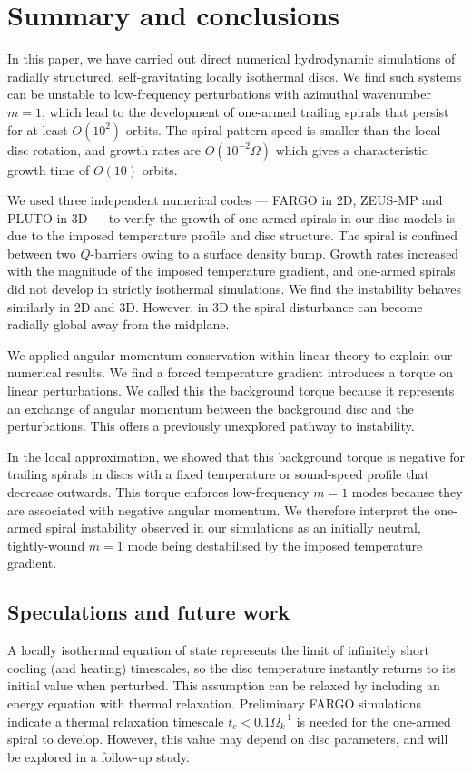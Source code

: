 \section{Summary and conclusions}\label{summary}
In this paper, we have carried out direct numerical hydrodynamic
simulations of radially structured, self-gravitating locally
isothermal discs.     
We find such systems can be unstable to low-frequency perturbations
with azimuthal wavenumber $m=1$, which lead to the development of one-armed 
trailing spirals that persist for at least $O(10^2)$ orbits. The 
spiral pattern speed is smaller than the local disc rotation, and
growth rates are $O(10^{-2}\Omega)$ which gives a characteristic
growth time of $O(10)$ orbits.   

We used three independent numerical codes --- FARGO in 2D, ZEUS-MP and
PLUTO in 3D --- to verify the growth of  
one-armed spirals in our disc models is due to the imposed temperature
profile and disc structure. The spiral is confined between two
$Q$-barriers owing to a surface density bump. Growth rates increased
with the magnitude of the imposed temperature gradient, and one-armed
spirals did not develop in strictly isothermal simulations.  
We find the instability behaves similarly in 2D and 3D. However, in 3D
the spiral disturbance can become radially global away from 
the midplane.  

We applied angular momentum conservation within linear theory to
explain our numerical results. We find a   
forced temperature gradient introduces a torque on linear 
perturbations. We called this the background torque because it
represents an exchange of angular momentum between the background disc
and the perturbations. This offers a previously unexplored pathway to
instability. 

In the local approximation, we showed that this background torque is
negative for trailing spirals in discs with a fixed temperature or
sound-speed profile that decrease outwards. This torque enforces  
low-frequency $m=1$ modes because they are associated with negative
angular momentum. We therefore interpret the one-armed spiral instability
observed in our simulations as an initially neutral, tightly-wound
$m=1$ mode being destabilised by the imposed temperature gradient.   

\subsection{Speculations and future work}
A locally isothermal equation of state represents the limit of
infinitely short cooling (and heating) timescales, so the disc
temperature instantly returns to its initial value when perturbed.  
This assumption can be relaxed by including an energy equation with
thermal relaxation. Preliminary FARGO simulations
indicate a thermal relaxation timescale $t_c < 0.1\Omega_k^{-1}$ is
needed for the one-armed spiral to develop. However, this value may
depend on disc parameters, and will be explored in a follow-up  
study.  

